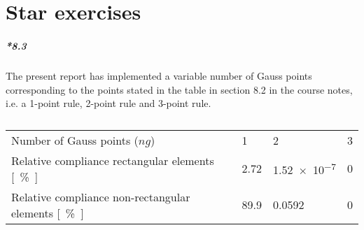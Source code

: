\chapter{Star exercises}
\paragraph{*8.3} The present report has implemented a variable number of Gauss points corresponding to the points stated in the table in section 8.2 in the course notes, i.e. a 1-point rule, 2-point rule and 3-point rule. 

\begin{table}[h!]
    \centering
    \caption{}
    \begin{tabular}{@{}llll@{}}
    \toprule                        
    Number of Gauss points ($ng$)                               & 1        & 2                 & 3     \\
    Relative compliance rectangular elements \si{[\percent]}    & 2.72     & \num{1.52e-7}     & 0     \\
    Relative compliance non-rectangular elements \si{[\percent]}& 89.9     & \num{0.0592}     & 0     \\
    \bottomrule
    \end{tabular}
    \label{tab:starex83}
\end{table}




